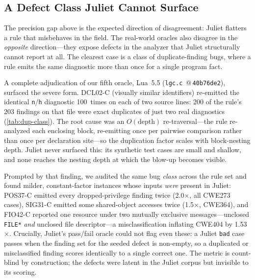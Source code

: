\subsection{A Defect Class Juliet Cannot Surface}
\label{sec:juliet-blindspot}

The precision gap above is the expected direction of disagreement:
Juliet flatters a rule that misbehaves in the field.  The real-world
oracles also disagree in the \emph{opposite} direction---they expose
defects in the analyzer that Juliet structurally cannot report at all.
The clearest case is a class of duplicate-finding bugs, where a rule
emits the same diagnostic more than once for a single program fact.

A complete adjudication of our fifth oracle, Lua~5.5
(\texttt{lgc.c}~@\,\texttt{40b76de2}), surfaced the severe form.  DCL02-C
(visually similar identifiers) re-emitted the identical \texttt{n}/\texttt{h}
diagnostic 100~times on each of two source lines: 200 of the rule's
203 findings on that file were exact duplicates of just two real
diagnostics (\cref{tab:dup-class}).  The root cause was an
$O(\text{depth})$ re-traversal---the rule re-analyzed each enclosing
block, re-emitting once per pairwise comparison rather than once per
declaration site---so the duplication factor scales with block-nesting
depth.  Juliet never surfaced this: its synthetic test cases are small
and shallow, and none reaches the nesting depth at which the blow-up
becomes visible.

Prompted by that finding, we audited the same bug \emph{class} across
the rule set and found milder, constant-factor instances whose inputs
\emph{were} present in Juliet: POS37-C emitted every dropped-privilege
finding twice (2.0$\times$, all CWE273 cases), SIG31-C emitted some
shared-object accesses twice (1.5$\times$, CWE364), and FIO42-C reported
one resource under two mutually exclusive messages---unclosed
\texttt{FILE*} \emph{and} unclosed file descriptor---a misclassification
inflating CWE404 by 1.53$\times$.  Crucially, Juliet's pass/fail oracle
could not flag even these: a Juliet \texttt{bad} case passes when the
finding set for the seeded defect is non-empty, so a duplicated or
misclassified finding scores identically to a single correct one.  The
metric is count-blind by construction; the defects were latent in the
Juliet corpus but invisible to its scoring.

